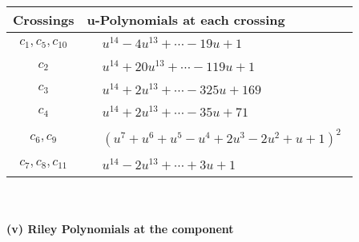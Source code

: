 \documentclass[1p]{elsarticle_modified}
\theoremstyle{definition}
\begin{document}
\begin{tabular}{m{50pt}|m{274pt}}
Crossings & \hspace{64pt}u-Polynomials at each crossing \\
\hline $$\begin{aligned}c_{1},c_{5},c_{10}\end{aligned}$$&$\begin{aligned}
&u^{14}-4 u^{13}+\cdots-19 u+1
\end{aligned}$\\
\hline $$\begin{aligned}c_{2}\end{aligned}$$&$\begin{aligned}
&u^{14}+20 u^{13}+\cdots-119 u+1
\end{aligned}$\\
\hline $$\begin{aligned}c_{3}\end{aligned}$$&$\begin{aligned}
&u^{14}+2 u^{13}+\cdots-325 u+169
\end{aligned}$\\
\hline $$\begin{aligned}c_{4}\end{aligned}$$&$\begin{aligned}
&u^{14}+2 u^{13}+\cdots-35 u+71
\end{aligned}$\\
\hline $$\begin{aligned}c_{6},c_{9}\end{aligned}$$&$\begin{aligned}
&(u^7+u^6+u^5- u^4+2 u^3-2 u^2+u+1)^2
\end{aligned}$\\
\hline $$\begin{aligned}c_{7},c_{8},c_{11}\end{aligned}$$&$\begin{aligned}
&u^{14}-2 u^{13}+\cdots+3 u+1
\end{aligned}$\\
\hline
\end{tabular}\\~\\
\newpage\renewcommand{\arraystretch}{1}
\flushleft \textbf{(v) Riley Polynomials at the component}\newline \\
\end{document}
